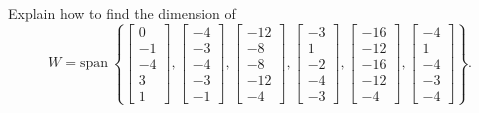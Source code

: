 \documentclass{article}
\begin{document}
\begin{exerciseStatement}
    Explain how to find the dimension of
\[W=\mathrm{span}\ \left\{\left[\begin{array}{r}
0 \\
-1 \\
-4 \\
3 \\
1
\end{array}\right] , \left[\begin{array}{r}
-4 \\
-3 \\
-4 \\
-3 \\
-1
\end{array}\right] , \left[\begin{array}{r}
-12 \\
-8 \\
-8 \\
-12 \\
-4
\end{array}\right] , \left[\begin{array}{r}
-3 \\
1 \\
-2 \\
-4 \\
-3
\end{array}\right] , \left[\begin{array}{r}
-16 \\
-12 \\
-16 \\
-12 \\
-4
\end{array}\right] , \left[\begin{array}{r}
-4 \\
1 \\
-4 \\
-3 \\
-4
\end{array}\right]\right\}.\]



  
\end{exerciseStatement}
\end{document}
